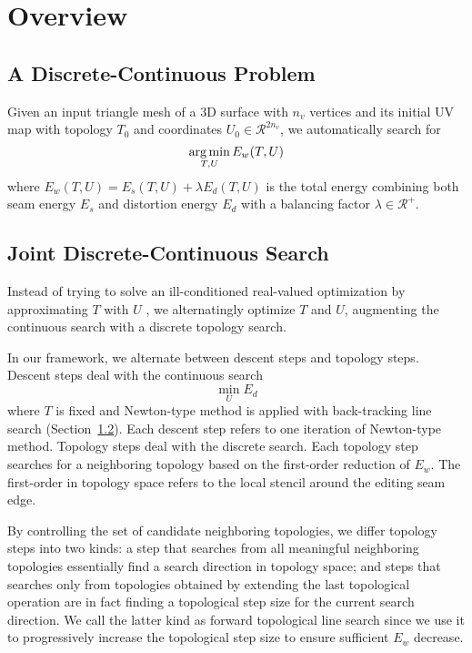 
\section{Overview}

\subsection{A Discrete-Continuous Problem}

Given an input triangle mesh of a 3D surface with $n_v$ vertices and its initial UV map with topology $T_0$ and coordinates $U_0 \in \mathcal{R}^{2n_v}$, we automatically search for
\[ \operatorname*{arg\,min}_{T,U} E_w(T,U) \]
where $E_w(T,U) = E_s(T,U) + \lambda E_d(T,U)$ is the total energy combining both seam energy $E_s$ and distortion energy $E_d$ with a balancing factor $\lambda \in \mathcal{R^+}$.

\subsection{Joint Discrete-Continuous Search}

Instead of trying to solve an ill-conditioned real-valued optimization by approximating $T$ with $U$ \cite{Poranne2017Autocuts}, we alternatingly optimize $T$ and $U$, augmenting the continuous search with a discrete topology search.

In our framework, we alternate between descent steps and topology steps.
Descent steps deal with the continuous search
\[ \min_U E_d \]
where $T$ is fixed and Newton-type method is applied with back-tracking line search (Section~\ref{}). Each descent step refers to one iteration of Newton-type method. 
Topology steps deal with the discrete search. Each topology step searches for a neighboring topology based on the first-order reduction of $E_w$. The first-order in topology space refers to the local stencil around the editing seam edge.

By controlling the set of candidate neighboring topologies, we differ topology steps into two kinds: a step that searches from all meaningful neighboring topologies essentially find a search direction in topology space; and steps that searches only from topologies obtained by extending the last topological operation are in fact finding a topological step size for the current search direction. We call the latter kind as forward topological line search since we use it to progressively increase the topological step size to ensure sufficient $E_w$ decrease.

